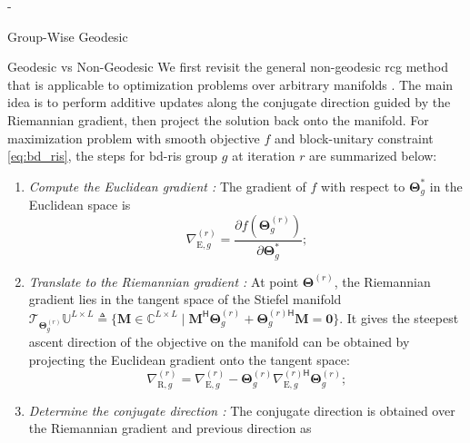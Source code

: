 \begin{section}{-}
\begin{subsection}{Group-Wise Geodesic }
		\begin{subsubsection}{Geodesic vs Non-Geodesic }
			We first revisit the general non-geodesic \gls{rcg} method that is applicable to optimization problems over arbitrary manifolds \cite{Absil2009,Pan2022d}.
			The main idea is to perform {additive} updates along the conjugate direction guided by the Riemannian gradient, then {project} the solution back onto the manifold.
			For maximization problem with smooth objective $f$ and block-unitary constraint \eqref{eq:bd_ris}, the steps for \gls{bd}-\gls{ris} group $g$ at iteration $r$ are summarized below:
			\begin{enumerate}
				\item \emph{Compute the Euclidean gradient \cite{Hjorungnes2007}:} The gradient of $f$ with respect to $\mathbf{\Theta}_g^*$ in the Euclidean space is
				\begin{equation}
					\nabla_{\mathrm{E},g}^{(r)} = \frac{\partial f(\mathbf{\Theta}_g^{(r)})}{\partial \mathbf{\Theta}_g^*};
					\label{eq:gradient_euclidean}
				\end{equation}
				\item \emph{Translate to the Riemannian gradient \cite{Absil2009}:} At point $\mathbf{\Theta}^{(r)}$, the Riemannian gradient lies in the tangent space of the Stiefel manifold $\mathcal{T}_{\mathbf{\Theta}_g^{(r)}}\mathbb{U}^{L \times L} \triangleq \{\mathbf{M} \in \mathbb{C}^{L \times L} \mid \mathbf{M}^\mathsf{H} \mathbf{\Theta}_g^{(r)} + {\mathbf{\Theta}_g^{(r)\mathsf{H}}} \mathbf{M} = \mathbf{0}\}$. It gives the steepest ascent direction of the objective on the manifold can be obtained by projecting the Euclidean gradient onto the tangent space:
				\begin{equation}
					\nabla_{\mathrm{R},g}^{(r)} = \nabla_{\mathrm{E},g}^{(r)} - \mathbf{\Theta}_g^{(r)} {\nabla_{\mathrm{E},g}^{(r)\mathsf{H}}} \mathbf{\Theta}_g^{(r)};
					\label{eq:gradient_riemannian}
				\end{equation}
				\item \emph{Determine the conjugate direction \cite{Nocedal2006}:} The conjugate direction is obtained over the Riemannian gradient and previous direction as

\end{enumerate}
\end{subsubsection}
\end{subsection}
\end{section}
